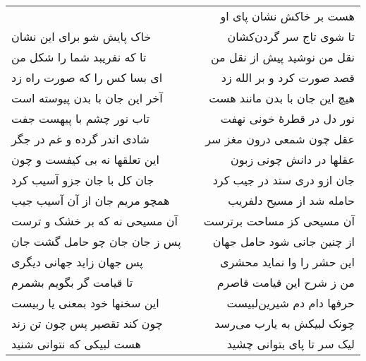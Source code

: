 \begin{center}
\begin{longtable}{l p{0.5cm} r}
&&
هست بر خاکش نشان پای او
\\
خاک پایش شو برای این نشان
&&
تا شوی تاج سر گردن‌کشان
\\
تا که نفریبد شما را شکل من
&&
نقل من نوشید پیش از نقل من
\\
ای بسا کس را که صورت راه زد
&&
قصد صورت کرد و بر الله زد
\\
آخر این جان با بدن پیوسته است
&&
هیچ این جان با بدن مانند هست
\\
تاب نور چشم با پیهست جفت
&&
نور دل در قطرهٔ خونی نهفت
\\
شادی اندر گرده و غم در جگر
&&
عقل چون شمعی درون مغز سر
\\
این تعلقها نه بی کیفست و چون
&&
عقلها در دانش چونی زبون
\\
جان کل با جان جزو آسیب کرد
&&
جان ازو دری ستد در جیب کرد
\\
همچو مریم جان از آن آسیب جیب
&&
حامله شد از مسیح دلفریب
\\
آن مسیحی نه که بر خشک و ترست
&&
آن مسیحی کز مساحت برترست
\\
پس ز جان جان چو حامل گشت جان
&&
از چنین جانی شود حامل جهان
\\
پس جهان زاید جهانی دیگری
&&
این حشر را وا نماید محشری
\\
تا قیامت گر بگویم بشمرم
&&
من ز شرح این قیامت قاصرم
\\
این سخنها خود بمعنی یا ربیست
&&
حرفها دام دم شیرین‌لبیست
\\
چون کند تقصیر پس چون تن زند
&&
چونک لبیکش به یارب می‌رسد
\\
هست لبیکی که نتوانی شنید
&&
لیک سر تا پای بتوانی چشید
\\
\end{longtable}
\end{center}

